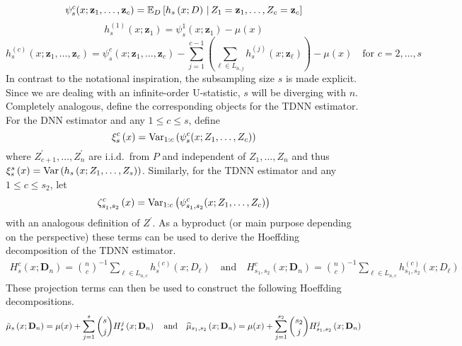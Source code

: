 \begin{equation}\label{eq:psi_s_c}
	\psi_{s}^{c}(x; \mathbf{z}_{1}, \dotsc, \mathbf{z}_{c})
	= \E_{D}\left[h_{s}\left(x; D\right) \, | \,  Z_1 = \mathbf{z}_{1}, \dotsc, Z_c = \mathbf{z}_{c}\right]
\end{equation}
\begin{equation}
	h_{s}^{(1)}\left(x; \mathbf{z}_{1}\right)
	= \psi_{s}^{1}(x; \mathbf{z}_{1}) - \mu(x)
\end{equation}
\begin{equation}
	h_{s}^{(c)}\left(x; \mathbf{z}_{1}, \dotsc, \mathbf{z}_{c}\right)
	= \psi_{s}^{c}(x; \mathbf{z}_{1}, \dotsc, \mathbf{z}_{c}) - \sum_{j = 1}^{c-1}\left(\sum_{\ell \in L_{n,j}}h_{s}^{(j)}(x; \mathbf{z}_{\ell})\right) - \mu(x)
	\quad \text{for } c = 2, \dotsc, s
\end{equation}
In contrast to the notational inspiration, the subsampling size $s$ is made explicit.
Since we are dealing with an infinite-order U-statistic, $s$ will be diverging with $n$.
Completely analogous, define the corresponding objects for the TDNN estimator.
For the DNN estimator and any $1 \leq c \leq s$, define
\begin{equation}\label{eq:xi_s_c}
	\xi_{s}^{c}\left(x\right)
	= \Var_{1:c}\left(\psi_{s}^{c}(x; Z_{1}, \dotsc, Z_{c})\right)
\end{equation}
where $Z_{c+1}^{\prime}, \ldots, Z_n^{\prime}$ are i.i.d.\ from $P$ and independent of $Z_1, \ldots, Z_n$ and thus
$\xi_{s}^{s}\left(x\right) = \Var\left(h_s\left(x; Z_1, \ldots, Z_s\right)\right)$.
Similarly, for the TDNN estimator and any $1 \leq c \leq s_2$, let
\begin{equation}\label{eq:zeta_s1s2_c}
	\zeta_{s_1, s_2}^{c}\left(x\right)
	= \Var_{1:c}\left(\psi_{s_1, s_2}^{c}(x; Z_{1}, \dotsc, Z_{c})\right)
\end{equation}
with an analogous definition of $Z^{\prime}$.
As a byproduct (or main purpose depending on the perspective) these terms can be used to derive the Hoeffding decomposition of the TDNN estimator.
\begin{equation}\label{eq:H_projection}
	\begin{aligned}
		H_{s}^{c}\left(x; \mathbf{D}_n\right)
		= \binom{n}{c}^{-1} \sum_{\ell \in L_{n,c}} h^{(c)}_{s}(x; D_{\ell})
		\quad \text{and} \quad
		H_{s_1, s_2}^{c}\left(x; \mathbf{D}_n\right)
		= \binom{n}{c}^{-1} \sum_{\ell \in L_{n,c}} h^{(c)}_{s_1, s_2}(x; D_{\ell})
	\end{aligned}
\end{equation}
These projection terms can then be used to construct the following Hoeffding decompositions.
\begin{equation}\label{eq:H_Decomp}
	\tilde{\mu}_{s}\left(x; \mathbf{D}_n\right)
	= \mu(x) + \sum_{j = 1}^{s}\binom{s}{j}H_{s}^{j}\left(x; \mathbf{D}_n\right)\\
	\quad \text{and} \quad
	\hat{\mu}_{s_1, s_2}\left(x; \mathbf{D}_n\right)
	= \mu(x) + \sum_{j = 1}^{s_2}\binom{s_2}{j}H_{s_1, s_2}^{j}\left(x; \mathbf{D}_n\right)
\end{equation}

